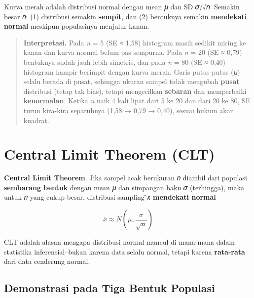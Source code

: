 \documentclass[
  indonesian,
  letterpaper,
]{book}
\begin{document}
Kurva merah adalah distribusi normal dengan mean 𝜇 dan SD 𝜎/√𝑛. Semakin
besar 𝑛: (1) distribusi semakin \textbf{sempit}, dan (2) bentuknya
semakin \textbf{mendekati normal} meskipun populasinya menjulur kanan.

\begin{quote}
\textbf{Interpretasi.} Pada \emph{n} = 5 (SE ≈ 1,58) histogram masih
sedikit miring ke kanan dan kurva normal belum pas sempurna. Pada
\emph{n} = 20 (SE ≈ 0,79) bentuknya sudah jauh lebih simetris, dan pada
\emph{n} = 80 (SE ≈ 0,40) histogram hampir berimpit dengan kurva merah.
Garis putus-putus (𝜇) selalu berada di pusat, sehingga ukuran sampel
tidak mengubah \textbf{pusat} distribusi (tetap tak bias), tetapi
mengecilkan \textbf{sebaran} dan memperbaiki \textbf{kenormalan}. Ketika
\emph{n} naik 4 kali lipat dari 5 ke 20 dan dari 20 ke 80, SE turun
kira-kira separuhnya (1,58 → 0,79 → 0,40), sesuai hukum akar kuadrat.
\end{quote}

\section{Central Limit Theorem (CLT)}\label{central-limit-theorem-clt}

\textbf{Central Limit Theorem}. Jika sampel acak berukuran 𝑛 diambil
dari populasi \textbf{sembarang bentuk} dengan mean 𝜇 dan simpangan baku
𝜎 (terhingga), maka untuk 𝑛 yang cukup besar, distribusi sampling ̄𝑥
\textbf{mendekati normal}

\[\bar{x} \approx N\left(\mu, \frac{\sigma}{\sqrt{n}}\right)\]

CLT adalah alasan mengapa distribusi normal muncul di mana-mana dalam
statistika inferensial--bukan karena data selalu normal, tetapi karena
\textbf{rata-rata} dari data cenderung normal.

\subsection{Demonstrasi pada Tiga Bentuk
Populasi}\label{demonstrasi-pada-tiga-bentuk-populasi}
\end{document}

